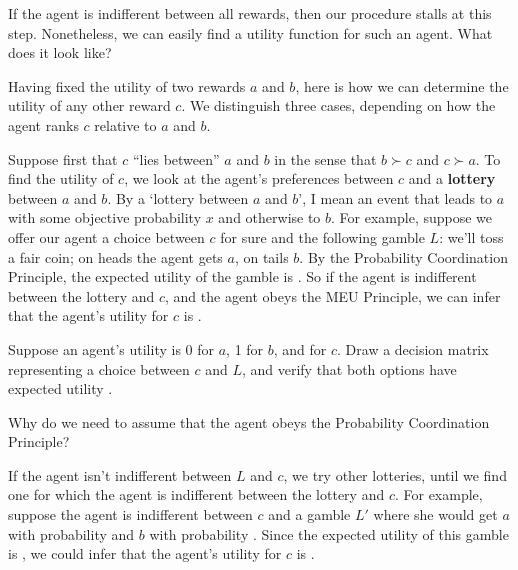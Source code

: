 \begin{exercise}{2}
  If the agent is indifferent between all rewards, then our procedure
  stalls at this step. Nonetheless, we can easily find a utility
  function for such an agent. What does it look like? 
\end{exercise}

Having fixed the utility of two rewards $a$ and $b$, here is how we
can determine the utility of any other reward $c$. We distinguish
three cases, depending on how the agent ranks $c$ relative to $a$ and
$b$.

Suppose first that $c$ ``lies between'' $a$ and $b$ in the sense that
$b \succ c$ and $c \succ a$. To find the utility of $c$, we look at
the agent's preferences between $c$ and a \textbf{lottery} between $a$
and $b$. By a `lottery between $a$ and $b$', I mean an event that
leads to $a$ with some objective probability $x$ and otherwise to $b$.
For example, suppose we offer our agent a choice between $c$ for sure
and the following gamble $L$: we'll toss a fair coin; on heads the
agent gets $a$, on tails $b$. By the Probability Coordination
Principle, the expected utility of the gamble is%
\cmnt{%
\[
  EU(L) = \nicefrac{1}{2} \cdot U(a) + \nicefrac{1}{2} \cdot U(b) =  
   \nicefrac{1}{2} \cdot 0 + \nicefrac{1}{2} \cdot 1 = \nicefrac{1}{2}. 
\]
} %
. So if the agent is indifferent between the lottery and $c$, and
the agent obeys the MEU Principle, we can infer that the agent's utility for $c$
is .

\begin{exercise}{1}
  Suppose an agent's utility is 0 for $a$, 1 for $b$, and
   for $c$. Draw a decision matrix representing a
  choice between $c$ and $L$, and verify that both options have
  expected utility .
\end{exercise}

\begin{exercise}{2}
  Why do we need to assume that the agent obeys the Probability
  Coordination Principle?
\end{exercise}

If the agent isn't indifferent between $L$ and $c$, we try other
lotteries, until we find one for which the agent is indifferent
between the lottery and $c$.%
For example, suppose the agent is indifferent between $c$ and a gamble
$L'$ where she would get $a$ with probability  and $b$
with probability . Since the expected utility of this
gamble is , we could infer that the agent's
utility for $c$ is .

